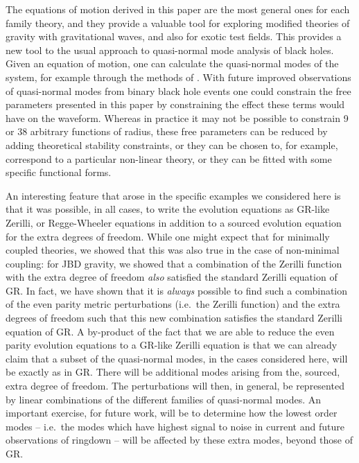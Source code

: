 \documentclass[10pt,twocolumn,preprintnumbers,amsmath,amssymb,nofootinbib
,superscriptaddress]{revtex4-1}
\begin{document}
{{{The equations of motion derived in this paper are the most general ones for each family theory, and they provide a valuable tool for exploring modified theories of gravity with gravitational waves, and also for exotic test fields. This provides a new tool to the usual approach to quasi-normal mode analysis of black holes. Given an equation of motion, one can calculate the quasi-normal modes of the system, for example through the methods of \cite{Molina:2010fb,Pani:2012zz}. With future improved observations of quasi-normal modes from binary black hole events one could constrain the free parameters presented in this paper by constraining the effect these terms would have on the waveform. Whereas in practice it may not be possible to constrain 9 or 38 arbitrary functions of radius, these free parameters can be reduced by adding theoretical stability constraints, or they can be chosen to, for example, correspond to a particular non-linear theory, or they can be fitted with some specific functional forms.

An interesting feature that arose in the specific examples we considered here is that it was possible, in all cases, to write the evolution equations as GR-like Zerilli, or Regge-Wheeler equations in addition to a sourced evolution equation for the extra degrees of freedom. While one might expect that for minimally coupled theories, we showed that this was also true in the case of non-minimal coupling: for JBD gravity, we showed that a combination of the Zerilli function with the extra degree of freedom {\it also} satisfied the standard Zerilli equation of GR. In fact, we have shown that it is {\it always} possible to find such a combination of the even parity metric perturbations (i.e.~the Zerilli function) and the extra degrees of freedom such that this new combination satisfies the standard Zerilli equation of GR. A by-product of the fact that we are able to reduce the even parity evolution equations to a GR-like Zerilli equation is that we can already claim that a subset of the quasi-normal modes, in the cases considered here, will be exactly as in GR. There will be additional modes arising from the, sourced, extra degree of freedom. The perturbations will then, in general, be represented by linear combinations of the different families of quasi-normal modes. An important exercise, for future work, will be to determine how the lowest order modes -- i.e.~the modes which have highest signal to noise in current and future observations of ringdown -- will be affected by these extra modes, beyond those of GR.

}}}
\end{document}
